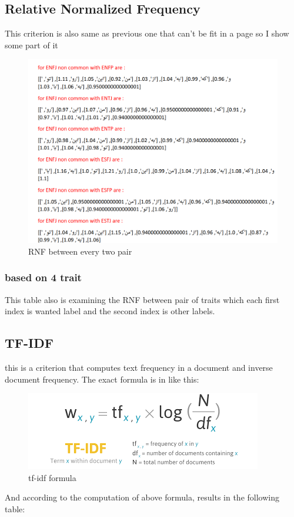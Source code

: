 \documentclass[10pt, a4paper]{article}
\newenvironment{Fa}{\begin{RTL}\faFont}{\end{RTL}}
\begin{document}
\subsection{Relative Normalized Frequency}
This criterion is also same as previous one that can't be fit in a page so I show some part of it
\begin{figure}[H]
    \centering
    \includegraphics[width=0.6\linewidth]{../stats/RNF.png}
    \caption{RNF between every two pair}
\end{figure}
\subsubsection{based on 4 trait}
This table also is examining the RNF between pair of traits which each first index is wanted label and the second index is other labels.
\\
\begin{Fa}
    \centering
    \begin{adjustbox}{max width=0.8\textwidth}
    \end{adjustbox}
\end{Fa}
\subsection{TF-IDF}
this is a criterion that computes text frequency in a document and inverse document frequency. The exact formula is in like this: 
\begin{figure}[H]
    \begin{center}
        \includegraphics[width=0.8\linewidth]{images/tf-idf.png}
        \caption{tf-idf formula}
    \end{center}
\end{figure}
And according to the computation of above formula, results in the following table:
\\
\begin{Fa}
    \centering
    \begin{adjustbox}{max width=\textwidth,totalheight=6cm}
    \end{adjustbox}
\end{Fa}
\newpage
\end{document}
